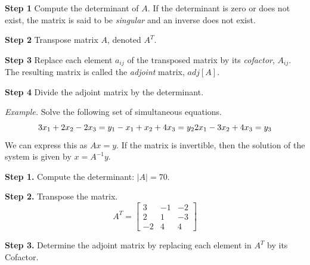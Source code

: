 \documentclass[
]{book}
\begin{document}
\textbf{Step 1} Compute the determinant of \(A\). If the determinant is zero or does not exist, the matrix is said to be \emph{singular} and an inverse does not exist.

\textbf{Step 2} Transpose matrix \(A\), denoted \(A^T\).

\textbf{Step 3} Replace each element \(a_{ij}\) of the transposed matrix by its \emph{cofactor}, \(A_{ij}\). The resulting matrix is called the \emph{adjoint} matrix, \(adj\left[A\right]\).

\textbf{Step 4} Divide the adjoint matrix by the determinant.

\emph{Example.} Solve the following set of simultaneous equations.
\[
3x_1 + 2x_2 - 2x_3 = y_1 \\
-x_1 +x_2 +4x_3 = y_2 \\
2x_1 -3x_2 +4x_3 = y_3
\]
We can express this as \(Ax = y\). If the matrix is invertible, then the solution of the system is given by \(x = A^{-1} y\).

\textbf{Step 1.} Compute the determinant: \(|A| = 70\).

\textbf{Step 2.} Transpose the matrix.
\[
A^T = \begin{bmatrix} 
3 & -1 & -2 \\ 
2 & 1 & -3 \\
-2 & 4 & 4
\end{bmatrix} 
\]

\textbf{Step 3.} Determine the adjoint matrix by replacing each element in \(A^T\) by its Cofactor.
\end{document}
